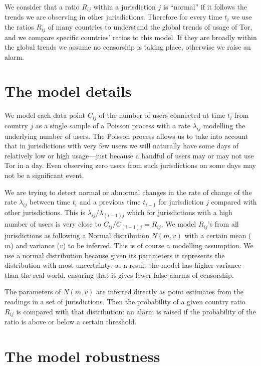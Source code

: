 \documentclass{article}
\begin{document}
We consider that a ratio $R_{ij}$ within a jurisdiction $j$ is ``normal''
if it follows the trends we are observing in other jurisdictions.
Therefore for every time $t_i$ we use the ratios $R_{ij}$ of many
countries to understand the global trends of usage of Tor, and we compare
specific countries' ratios to this model.
If they are broadly within the global trends we assume no censorship is
taking place, otherwise we raise an alarm.

\section{The model details}

We model each data point $C_{ij}$ of the number of users connected at time
$t_i$ from country $j$ as a single sample of a Poisson process with a rate
$\lambda_{ij}$ modelling the underlying number of users.
The Poisson process allows us to take into account that in jurisdictions
with very few users we will naturally have some days of relatively low or
high usage---just because a handful of users may or may not use Tor in a
day.
Even observing zero users from such jurisdictions on some days may not be
a significant event. 

We are trying to detect normal or abnormal changes in the rate of change
of the rate $\lambda_{ij}$ between time $t_i$ and a previous time
$t_{i-1}$ for jurisdiction $j$ compared with other jurisdictions.
This is $\lambda_{ij} / \lambda_{(i-1)j}$ which for jurisdictions with a
high number of users is very close to $C_{ij} / C_{(i-1)j} = R_{ij}$.
We model $R_{ij}$'s from all jurisdictions as following a Normal
distribution $N(m,v)$ with a certain mean ($m$) and variance ($v$) to be
inferred.
This is of course a modelling assumption.
We use a normal distribution because given its parameters it represents
the distribution with most uncertainty: as a result the model has higher
variance than the real world, ensuring that it gives fewer false alarms of
censorship.

The parameters of $N(m,v)$ are inferred directly as point estimates from
the readings in a set of jurisdictions.
Then the probability of a given country ratio $R_{ij}$ is compared with
that distribution: an alarm is raised if the probability of the ratio is
above or below a certain threshold.

\section{The model robustness}
\end{document}
